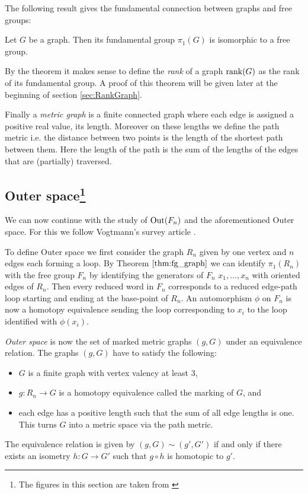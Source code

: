 The following result gives the fundamental connection between graphs and free groups:
\begin{theorem}\label{thm:fg_graph}
	Let $G$ be a graph. Then its fundamental group $\pi_{1}(G)$ is isomorphic to a free group.
\end{theorem}
By the theorem it makes sense to define the \emph{rank} of a graph $\rank(G)$ as the rank of its fundamental group.
A proof of this theorem will be given later at the beginning of section \ref{sec:RankGraph}.

Finally a \emph{metric graph} is a finite connected graph where each edge is assigned a positive real value, its length. 
Moreover on these lengths we define the path metric i.e.
the distance between two points is the length of the shortest path between them.
Here the length of the path is the sum of the lengths of the edges that are (partially) traversed.

\subsection{Outer space\footnote{The figures in this section are taken from \cite{vogtmann02}}}
We can now continue with the study of $\operatorname{Out}(F_{n})$ and the aforementioned Outer space. 
For this we follow Vogtmann's survey article \cite{vogtmann02}.

To define Outer space we first consider the graph $R_{n}$ given by one vertex and $n$ edges each forming a loop.
By Theorem $\ref{thm:fg_graph}$ we can identify $\pi_1(R_{n})$ with the free group $F_{n}$ by
identifying the generators of $F_{n}$ $x_1,\ldots,x_{n}$ with oriented edges of $R_{n}$.
Then every reduced word in $F_{n}$ corresponds to a reduced edge-path loop starting and ending at the base-point of $R_{n}$.
An automorphism $\phi$ on $F_{n}$ is now a homotopy equivalence sending the loop corresponding to $x_{i}$
to the loop identified with $\phi(x_{i})$.

\emph{Outer space} is now the set of marked metric graphs $(g,G)$ under an equivalence relation.
The graphs $(g,G)$ have to satisfy the following:
\begin{itemize}
	\item $G$ is a finite graph with vertex valency at least $3$,
	\item $g: R_{n} \to G$ is a homotopy equivalence called the marking of $G$, and
	\item each edge has a positive length such that the sum of all
		edge lengths is one. This turns $G$ into a metric space via the path metric.
\end{itemize}
The equivalence relation is given by $(g,G) \sim (g',G')$ if and only if 
there exists an isometry $h: G \to G'$ such that $g \circ h$ is homotopic to $g'$.

